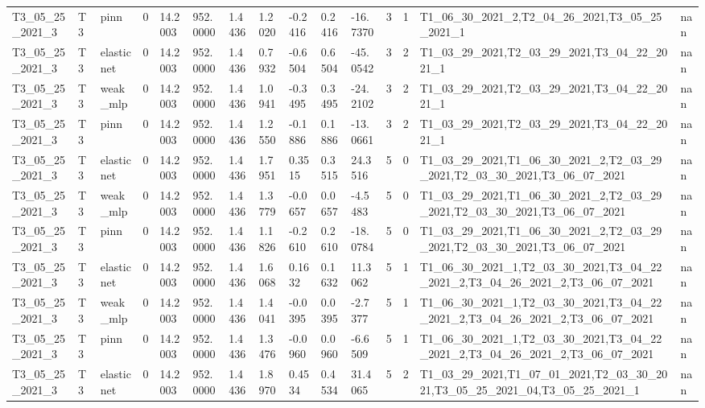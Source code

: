 \begin{table}[t]
\begin{tabular}{lllllllllllllll}
T3\_05\_25\_2021\_3 & T3 & pinn & 0 & 14.2003 & 952.0000 & 1.4436 & 1.2020 & -0.2416 & 0.2416 & -16.7370 & 3 & 1 & T1\_06\_30\_2021\_2,T2\_04\_26\_2021,T3\_05\_25\_2021\_1 & nan \\
T3\_05\_25\_2021\_3 & T3 & elasticnet & 0 & 14.2003 & 952.0000 & 1.4436 & 0.7932 & -0.6504 & 0.6504 & -45.0542 & 3 & 2 & T1\_03\_29\_2021,T2\_03\_29\_2021,T3\_04\_22\_2021\_1 & nan \\
T3\_05\_25\_2021\_3 & T3 & weak\_mlp & 0 & 14.2003 & 952.0000 & 1.4436 & 1.0941 & -0.3495 & 0.3495 & -24.2102 & 3 & 2 & T1\_03\_29\_2021,T2\_03\_29\_2021,T3\_04\_22\_2021\_1 & nan \\
T3\_05\_25\_2021\_3 & T3 & pinn & 0 & 14.2003 & 952.0000 & 1.4436 & 1.2550 & -0.1886 & 0.1886 & -13.0661 & 3 & 2 & T1\_03\_29\_2021,T2\_03\_29\_2021,T3\_04\_22\_2021\_1 & nan \\
T3\_05\_25\_2021\_3 & T3 & elasticnet & 0 & 14.2003 & 952.0000 & 1.4436 & 1.7951 & 0.3515 & 0.3515 & 24.3516 & 5 & 0 & T1\_03\_29\_2021,T1\_06\_30\_2021\_2,T2\_03\_29\_2021,T2\_03\_30\_2021,T3\_06\_07\_2021 & nan \\
T3\_05\_25\_2021\_3 & T3 & weak\_mlp & 0 & 14.2003 & 952.0000 & 1.4436 & 1.3779 & -0.0657 & 0.0657 & -4.5483 & 5 & 0 & T1\_03\_29\_2021,T1\_06\_30\_2021\_2,T2\_03\_29\_2021,T2\_03\_30\_2021,T3\_06\_07\_2021 & nan \\
T3\_05\_25\_2021\_3 & T3 & pinn & 0 & 14.2003 & 952.0000 & 1.4436 & 1.1826 & -0.2610 & 0.2610 & -18.0784 & 5 & 0 & T1\_03\_29\_2021,T1\_06\_30\_2021\_2,T2\_03\_29\_2021,T2\_03\_30\_2021,T3\_06\_07\_2021 & nan \\
T3\_05\_25\_2021\_3 & T3 & elasticnet & 0 & 14.2003 & 952.0000 & 1.4436 & 1.6068 & 0.1632 & 0.1632 & 11.3062 & 5 & 1 & T1\_06\_30\_2021\_1,T2\_03\_30\_2021,T3\_04\_22\_2021\_2,T3\_04\_26\_2021\_2,T3\_06\_07\_2021 & nan \\
T3\_05\_25\_2021\_3 & T3 & weak\_mlp & 0 & 14.2003 & 952.0000 & 1.4436 & 1.4041 & -0.0395 & 0.0395 & -2.7377 & 5 & 1 & T1\_06\_30\_2021\_1,T2\_03\_30\_2021,T3\_04\_22\_2021\_2,T3\_04\_26\_2021\_2,T3\_06\_07\_2021 & nan \\
T3\_05\_25\_2021\_3 & T3 & pinn & 0 & 14.2003 & 952.0000 & 1.4436 & 1.3476 & -0.0960 & 0.0960 & -6.6509 & 5 & 1 & T1\_06\_30\_2021\_1,T2\_03\_30\_2021,T3\_04\_22\_2021\_2,T3\_04\_26\_2021\_2,T3\_06\_07\_2021 & nan \\
T3\_05\_25\_2021\_3 & T3 & elasticnet & 0 & 14.2003 & 952.0000 & 1.4436 & 1.8970 & 0.4534 & 0.4534 & 31.4065 & 5 & 2 & T1\_03\_29\_2021,T1\_07\_01\_2021,T2\_03\_30\_2021,T3\_05\_25\_2021\_04,T3\_05\_25\_2021\_1 & nan \\

\end{tabular}
\end{table}
